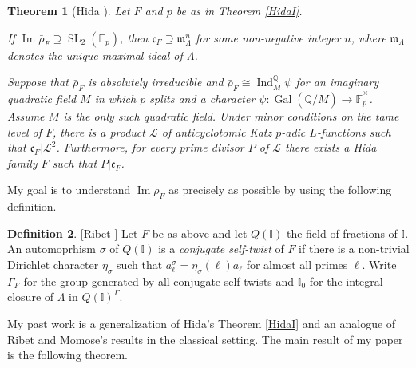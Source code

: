 \documentclass[11pt]{amsart}
\newtheorem{thm}{Theorem}[section]
\theoremstyle{definition}
\newtheorem{defn}[thm]{Definition}
\theoremstyle{remark}
\def\cc{\mathfrak{c}}
\def\F{\mathbb{F}}
\def\I{\mathbb{I}}
\def\aL{\mathcal{L}}
\def\m{\mathfrak{m}}
\def\Q{\mathbb{Q}}
\DeclareMathOperator{\Gal}{Gal}
\DeclareMathOperator{\im}{Im}
\DeclareMathOperator{\Ind}{Ind}
\DeclareMathOperator{\SL}{SL}
\begin{document}
\begin{thm}[Hida \cite{Hida15}]\label{HidaII}
Let $F$ and $p$ be as in Theorem \ref{HidaI}.
\begin{enumerate*}
\item If $\im \bar{\rho}_F \supseteq \SL_2(\F_p)$, then $\cc_F \supseteq \m_\Lambda^n$ for some non-negative integer $n$, where $\m_\Lambda$ denotes the unique maximal ideal of $\Lambda$.

\item\label{Katz case} Suppose that $\bar{\rho}_F$ is absolutely irreducible and $\bar{\rho}_F \cong \Ind_M^\Q \bar{\psi}$ for an imaginary quadratic field $M$ in which $p$ splits and a character $\bar{\psi} : \Gal(\overline{\Q}/M) \to \overline{\F}_p^\times$.  Assume $M$ is the only such quadratic field.  Under minor conditions on the tame level of $F$, there is a product $\aL$ of anticyclotomic Katz $p$-adic $L$-functions such that $\cc_F | \aL^2$.  Furthermore, for every prime divisor $P$ of $\aL$ there exists a Hida family $F$ such that $P | \cc_F$.
\end{enumerate*} 
\end{thm}

My goal is to understand $\im \rho_F$ as precisely as possible by using the following definition.  

\begin{defn}\label{cst defn}[Ribet \cite{Ribet77}]
Let $F$ be as above and let $Q(\I)$ the field of fractions of $\I$.  An automoprhism $\sigma$ of $Q(\I)$ is a \textit{conjugate self-twist} of $F$ if there is a non-trivial Dirichlet character $\eta_\sigma$ such that $a_\ell^{\sigma} = \eta_\sigma(\ell)a_\ell$ for almost all primes $\ell$.  Write $\Gamma_F$ for the group generated by all conjugate self-twists and $\I_0$ for the integral closure of $\Lambda$ in $Q(\I)^\Gamma$.
\end{defn}

My past work is a generalization of Hida's Theorem \ref{HidaI} and an analogue of Ribet \cite{Ribet83} and Momose's \cite{Momose81} results in the classical setting.  The main result of my paper \cite{Lang15} is the following theorem.
\end{document}
